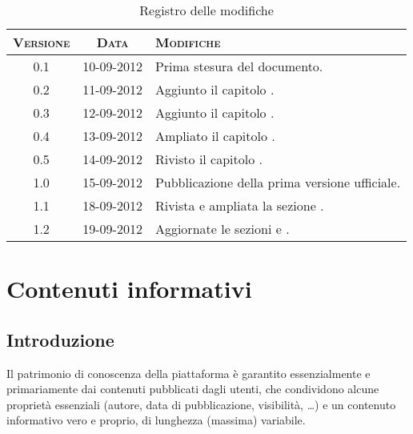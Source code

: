 \documentclass[10pt,a4paper,headinclude,footinclude,hidelinks]{scrreprt} %
\begin{document}
    \title{\rmfamily\normalfont{}}
    \author{}
    \date{\today}
    
    \maketitle
    
    \begin{abstract}
        \noindent Il documento presenta i risultati delle fasi di analisi e di progettazione dei nuovi criteri di classificazione.
    \end{abstract}
    
	\begin{table}[ht]
	\centering
	\begin{tabular}{|c|c|l|}
	\hline
	\textsc{Versione} & \textsc{Data} & \textsc{Modifiche} \\ \hline
	0.1 & 10-09-2012 & Prima stesura del documento. \\ \hline
	0.2 & 11-09-2012 & Aggiunto il capitolo \nameref{ch:stage:contenuti}. \\ \hline
	0.3 & 12-09-2012 & Aggiunto il capitolo \nameref{ch:stage:req}. \\ \hline
	0.4 & 13-09-2012 & Ampliato il capitolo \nameref{ch:stage:req}. \\ \hline
	0.5 & 14-09-2012 & Rivisto il capitolo \nameref{ch:stage:req}. \\ \hline
	1.0 & 15-09-2012 & Pubblicazione della prima versione ufficiale. \\ \hline
	1.1 & 18-09-2012 & Rivista e ampliata la sezione \nameref{ch:stage:req}. \\ \hline
	1.2 & 19-09-2012 & Aggiornate le sezioni \textit{\nameref{sec:stage:req:entità}} e \textit{\nameref{sec:stage:req:etichette}}. \\ \hline
	\end{tabular}
	\caption{Registro delle modifiche}
	\label{tab:stage:wp:workload}
	\end{table}

	\tableofcontents

	\chapter{Contenuti informativi}
	\label{ch:stage:contenuti}
	\section{Introduzione}
	Il patrimonio di conoscenza della piattaforma è garantito essenzialmente e primariamente dai contenuti pubblicati dagli utenti, che condividono alcune proprietà essenziali (autore, data di pubblicazione, visibilità, \ldots) e un contenuto informativo vero e proprio, di lunghezza (massima) variabile.
\end{document}
